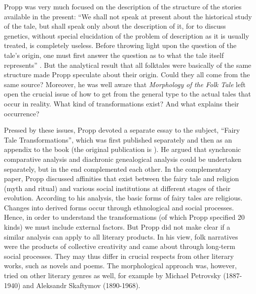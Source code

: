 \documentclass[output=paper]{langscibook}
\begin{document}
Propp was very much focused on the description of the structure of the stories available in the present: ``We shall not speak at present about the historical study of the tale, but shall speak only about the description of it, for to discuss genetics, without special elucidation of the problem of description as it is usually treated, is completely useless. Before throwing light upon the question of the tale's origin, one must first answer the question as to what the tale itself represents'' \citep[5]{Propp1968}. But the analytical result that all folktales were basically of the same structure made Propp speculate about their origin. Could they all come from the same source? Moreover, he was well aware that \emph{Morphology of the Folk Tale} left open the crucial issue of how to get from the general type to the actual tales that occur in reality. What kind of transformations exist? And what explains their occurrence? 

Pressed by these issues, Propp devoted a separate essay to the subject, ``Fairy Tale Transformations'', which was first published separately and then as an appendix to the book (the original publication is \citealt{Propp1928}). He argued that synchronic comparative analysis and diachronic genealogical analysis could be undertaken separately, but in the end complemented each other. In the complementary paper, Propp discussed affinities that exist between the fairy tale and religion (myth and ritual) and various social institutions at different stages of their evolution. According to his analysis, the basic forms of fairy tales are religious. Changes into derived forms occur through ethnological and social processes. Hence, in order to understand the transformations (of which Propp specified 20 kinds) we must include external factors. But Propp did not make clear if a similar analysis can apply to all literary products. In his view, folk narratives were the products of collective creativity and came about through long-term social processes. They may thus differ in crucial respects from other literary works, such as novels and poems. The morphological approach was, however, tried on other literary genres as well, for example by Michael Petrovsky (1887-1940) and Aleksandr Skaftymov (1890-1968).  
\end{document}

